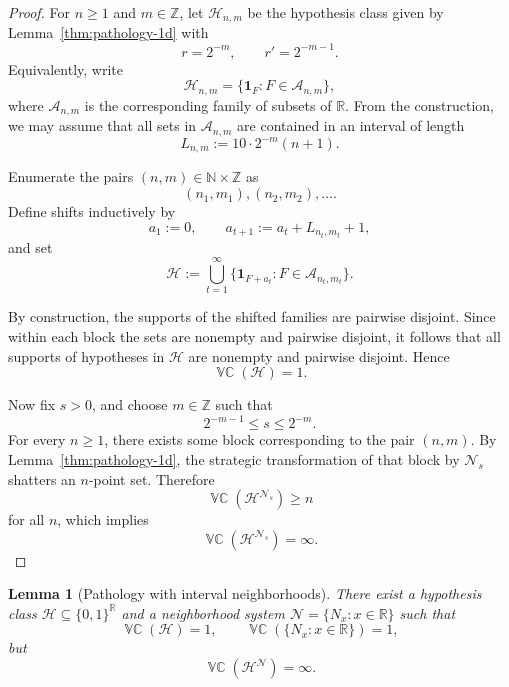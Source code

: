 \documentclass[11pt]{article}
\theoremstyle{plain}
\newtheorem{lemma}[theorem]{Lemma}
\theoremstyle{definition}
\theoremstyle{remark}
\DeclareMathOperator{\VCdim}{\mathbb{VC}}
\newcommand{\R}{\mathbb{R}}
\begin{document}
\begin{proof}
For \(n\ge1\) and \(m\in\mathbb Z\), let \(\mathcal H_{n,m}\) be the hypothesis
class given by Lemma~\ref{thm:pathology-1d} with
\[
r=2^{-m},\qquad r'=2^{-m-1}.
\]
Equivalently, write
\[
\mathcal H_{n,m}=\{\mathbf 1_{F}:F\in\mathcal A_{n,m}\},
\]
where \(\mathcal A_{n,m}\) is the corresponding family of subsets of \(\R\).
From the construction, we may assume that all sets in \(\mathcal A_{n,m}\)
are contained in an interval of length
\[
L_{n,m} := 10\cdot 2^{-m}(n+1).
\]

Enumerate the pairs \((n,m)\in\mathbb N\times\mathbb Z\) as
\[
(n_1,m_1),(n_2,m_2),\ldots .
\]
Define shifts inductively by
\[
a_1:=0,
\qquad
a_{t+1}:=a_t + L_{n_t,m_t} + 1,
\]
and set
\[
\mathcal H :=
\bigcup_{t=1}^\infty
\{\mathbf 1_{F+a_t}:F\in \mathcal A_{n_t,m_t}\}.
\]

By construction, the supports of the shifted families are pairwise disjoint.
Since within each block the sets are nonempty and pairwise disjoint, it follows
that all supports of hypotheses in \(\mathcal H\) are nonempty and pairwise
disjoint. Hence
\[
\VCdim(\mathcal H)=1.
\]

Now fix \(s>0\), and choose \(m\in\mathbb Z\) such that
\[
2^{-m-1} \le s \le 2^{-m}.
\]
For every \(n\ge1\), there exists some block corresponding to the pair \((n,m)\).
By Lemma~\ref{thm:pathology-1d}, the strategic transformation of that block by
\(\mathcal N_s\) shatters an \(n\)-point set. Therefore
\[
\VCdim(\mathcal H^{\mathcal N_s}) \ge n
\]
for all \(n\), which implies
\[
\VCdim(\mathcal H^{\mathcal N_s})=\infty.
\]
\end{proof}



\begin{lemma}[Pathology with interval neighborhoods]
\label{lem:pathology-interval-neighborhoods}
There exist a hypothesis class \(\mathcal H\subseteq \{0,1\}^{\mathbb R}\) and a
neighborhood system \(\mathcal N=\{N_x:x\in\mathbb R\}\) such that
\[
\VCdim(\mathcal H)=1,
\qquad
\VCdim(\{N_x:x\in\mathbb R\})=1,
\]
but
\[
\VCdim(\mathcal H^{\mathcal N})=\infty.
\]
\end{lemma}
\end{document}
